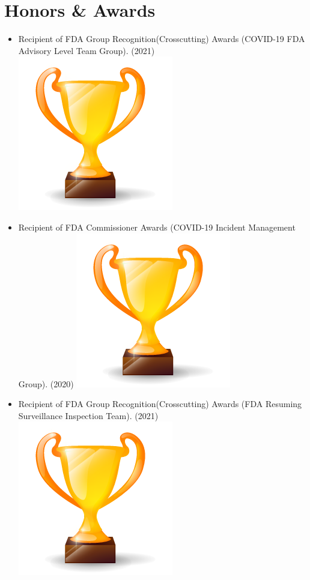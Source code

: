 \documentclass[letterpaper]{twentysecondcv} %
\begin{document}
     \section{Honors \& Awards}
{
        {\begin{itemize}
        
\item  Recipient of FDA Group Recognition(Crosscutting) Awards (COVID-19 FDA Advisory Level Team Group).  (2021)	\includegraphics[scale=0.05]{img/trophy.png}

\item  Recipient of FDA Commissioner Awards (COVID-19 Incident Management Group).  (2020)	\includegraphics[scale=0.05]{img/trophy.png}

\item  Recipient of FDA Group Recognition(Crosscutting) Awards (FDA Resuming Surveillance Inspection Team).  (2021)	\includegraphics[scale=0.05]{img/trophy.png}


\end{itemize}}}
\end{document}
